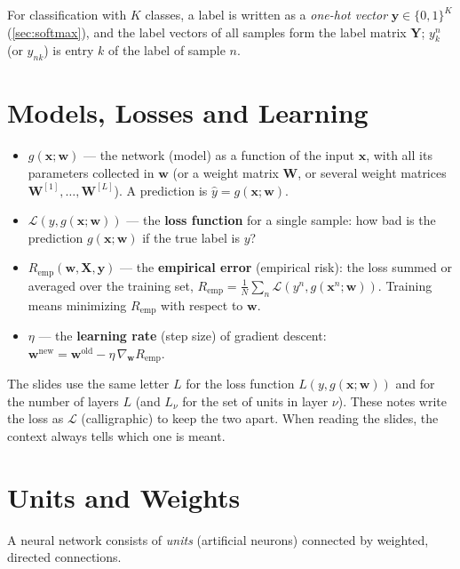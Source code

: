 \documentclass[11pt, oneside]{book}
\newcommand{\grad}{\nabla}               %
\newcommand{\loss}{\mathcal{L}}          %
\newcommand{\params}{\boldsymbol{\theta}}   %
\newcommand{\bx}{\bm{x}}        \newcommand{\by}{\bm{y}}
\newcommand{\bw}{\bm{w}}        \newcommand{\bW}{\bm{W}}
\newcommand{\bX}{\bm{X}}        \newcommand{\bY}{\bm{Y}}
\newcommand{\lay}[1]{^{[#1]}}            %
\newcommand{\Remp}{R_{\mathrm{emp}}}     %
\let\originalsection\section
\renewcommand{\section}{\Needspace{7\baselineskip}\originalsection}
\begin{document}
For classification with $K$ classes, a label is written as a
\emph{one-hot vector} $\by \in \{0,1\}^K$ (\cref{sec:softmax}), and the label
vectors of all samples form the label matrix $\bY$; $y^n_k$ (or $y_{nk}$) is
entry $k$ of the label of sample $n$.

\section{Models, Losses and Learning}

\begin{itemize}
  \item $g(\bx; \bw)$ --- the network (model) as a function of the input
    $\bx$, with all its parameters collected in $\bw$ (or a weight matrix
    $\bW$, or several weight matrices $\bW\lay{1}, \dots, \bW\lay{L}$).
    A prediction is $\hat y = g(\bx; \bw)$.
  \item $\loss(y, g(\bx; \bw))$ --- the \textbf{loss function} for a single
    sample: how bad is the prediction $g(\bx; \bw)$ if the true label is $y$?
  \item $\Remp(\bw, \bX, \by)$ --- the \textbf{empirical error} (empirical
    risk): the loss summed or averaged over the training set,
    $\Remp = \frac{1}{N}\sum_n \loss(y^n, g(\bx^n; \bw))$. Training means
    minimizing $\Remp$ with respect to $\bw$.
  \item $\eta$ --- the \textbf{learning rate} (step size) of gradient
    descent: $\bw^{\text{new}} = \bw^{\text{old}} - \eta\, \grad_{\bw}
    \Remp$.
\end{itemize}

\begin{notebox}[title={Loss $\loss$ versus number of layers $L$}]
The slides use the same letter $L$ for the loss function $L(y, g(\bx;\bw))$
and for the number of layers $L$ (and $L_\nu$ for the set of units in layer
$\nu$). These notes write the loss as $\loss$ (calligraphic) to keep the two
apart. When reading the slides, the context always tells which one is meant.
\end{notebox}

\section{Units and Weights}
\label{sec:notation-units}

A neural network consists of \emph{units} (artificial neurons) connected by
weighted, directed connections.
\end{document}
